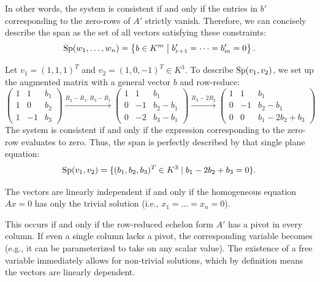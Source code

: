 \begin{answer}
In other words, the system is consistent if and only if the entries in $b'$ corresponding to the zero-rows of $A'$ strictly vanish. Therefore, we can concisely describe the span as the set of all vectors satisfying these constraints:
\[
\operatorname{Sp}(w_{1}, \dots, w_{n}) = \left\{ b \in K^{m} \;\middle|\; b'_{r+1} = \dots = b'_{m} = 0 \right\}.
\]
\end{answer}

\begin{example}
\label{ex:span_calc}
Let $v_{1} = (1, 1, 1)^{T}$ and $v_{2} = (1, 0, -1)^{T} \in K^{3}$. To describe $\operatorname{Sp}(v_{1}, v_{2})$, we set up the augmented matrix with a general vector $b$ and row-reduce:
\[
\left( \begin{array}{cc|c} 1 & 1 & b_{1} \\ 1 & 0 & b_{2} \\ 1 & -1 & b_{3} \end{array} \right) \xrightarrow{R_{2}-R_{1}, R_{3}-R_{1}} \left( \begin{array}{cc|c} 1 & 1 & b_{1} \\ 0 & -1 & b_{2}-b_{1} \\ 0 & -2 & b_{3}-b_{1} \end{array} \right) \xrightarrow{R_{3}-2R_{2}} \left( \begin{array}{cc|c} 1 & 1 & b_{1} \\ 0 & -1 & b_{2}-b_{1} \\ \hline 0 & 0 & b_{1}-2b_{2}+b_{3} \end{array} \right)
\]
The system is consistent if and only if the expression corresponding to the zero-row evaluates to zero. Thus, the span is perfectly described by that single plane equation:
\[
\operatorname{Sp}(v_{1}, v_{2}) = \{ (b_{1}, b_{2}, b_{3})^{T} \in K^{3} \mid b_{1} - 2b_{2} + b_{3} = 0 \}.
\]
\end{example}

\begin{answer}[To Question 3]
The vectors are linearly independent if and only if the homogeneous equation $Ax = 0$ has only the trivial solution (i.e., $x_1 = \dots = x_n = 0$). 

This occurs if and only if the row-reduced echelon form $A'$ has a pivot in every column. If even a single column lacks a pivot, the corresponding variable becomes  (e.g., it can be parameterized to take on any scalar value). The existence of a free variable immediately allows for non-trivial solutions, which by definition means the vectors are linearly dependent.
\end{answer}

